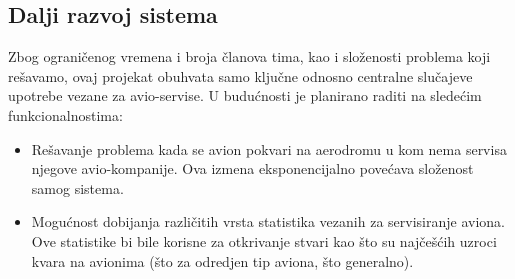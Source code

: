 \documentclass[a4paper]{article}
\begin{document}
\subsection{Dalji razvoj sistema}
\label{subsec:dalji_razvoj}

Zbog ograničenog vremena i broja članova tima, kao i složenosti problema koji rešavamo, ovaj projekat obuhvata samo ključne odnosno centralne slučajeve upotrebe vezane za avio-servise. U budućnosti je planirano raditi na sledećim funkcionalnostima:
\begin{itemize}
    \item Rešavanje problema kada se avion pokvari na aerodromu u kom nema servisa njegove avio-kompanije. Ova izmena eksponencijalno povećava složenost samog sistema.
    \item Mogućnost dobijanja različitih vrsta statistika vezanih za servisiranje aviona. Ove statistike bi bile korisne za otkrivanje stvari kao što su najčešćih uzroci kvara na avionima (što za odredjen tip aviona, što generalno).
\end{itemize}


\appendix
 

\end{document}

